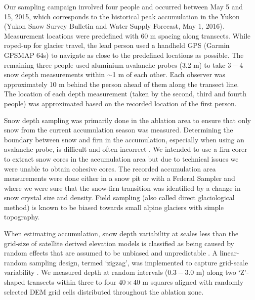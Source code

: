 \documentclass[twocolumn,letterpaper]{igs}
\begin{document}
Our sampling campaign involved four people and occurred between May 5 and 15, 2015, which corresponds to the historical peak accumulation in the Yukon (Yukon Snow Survey Bulletin and Water Supply Forecast, May 1, 2016). Measurement locations were predefined with 60 m spacing along transects. While roped-up for glacier travel, the lead person used a handheld GPS (Garmin GPSMAP 64s) to navigate as close to the predefined locations as possible. The remaining three people used aluminium avalanche probes (3.2 m) to take $3-4$ snow depth measurements within $\sim$1 m of each other. Each observer was approximately 10 m behind the person ahead of them along the transect line. The location of each depth measurement (taken by the second, third and fourth people) was approximated based on the recorded location of the first person. 

Snow depth sampling was primarily done in the ablation area to ensure that only snow from the current accumulation season was measured. Determining the boundary between snow and firn in the accumulation, especially when using an avalanche probe, is difficult and often incorrect \citep{Grunewald2010,Sold2013}. We intended to use a firn corer to extract snow cores in the accumulation area but due to technical issues we were unable to obtain cohesive cores. The recorded accumulation area measurements were done either in a snow pit or with a Federal Sampler and where we were sure that the snow-firn transition was identified by a change in snow crystal size and density. Field sampling (also called direct glaciological method) is known to be biased towards small alpine glaciers with simple topography.

When estimating accumulation, snow depth variability at scales less than the grid-size of satellite derived elevation models is classified as being caused by random effects that are assumed to be unbiased and unpredictable \citep{Watson2006}. A linear-random sampling design, termed `zigzag', was implemented to capture grid-scale variability \citep{Shea2010}. We measured depth at random intervals ($0.3 - 3.0$ m) along two `Z'-shaped transects within three to four $40\times40$ m squares aligned with randomly selected DEM grid cells distributed throughout the ablation zone.
\end{document}
